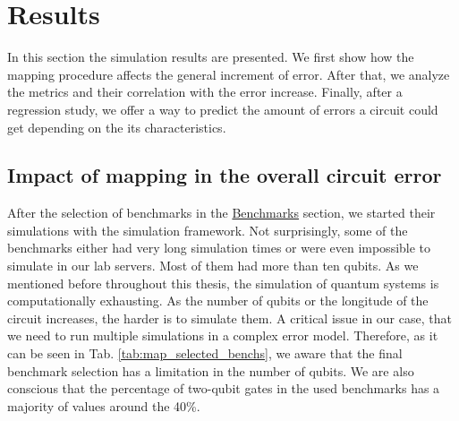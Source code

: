 
\chapter{Results}
\label{sec:org25630c4}

In this section the simulation results are presented.
We first show how the mapping procedure affects the general increment of error.
After that, we analyze the metrics and their correlation with the error increase.
Finally, after a regression study, we offer a way to predict the amount of errors a circuit could get depending on the its characteristics.

\section{Impact of mapping in the overall circuit error}
\label{sec:orga72fe94}

After the selection of benchmarks in the \href{chapter-4.org}{Benchmarks} section, we started their simulations with the simulation framework.
Not surprisingly, some of the benchmarks either had very long simulation times or were even impossible to simulate in our lab servers.
Most of them had more than ten qubits.
As we mentioned before throughout this thesis, the simulation of quantum systems is computationally exhausting.
As the number of qubits or the longitude of the circuit increases, the harder is to simulate them.
A critical issue in our case, that we need to run multiple simulations in a complex error model.
Therefore, as it can be seen in Tab. \ref{tab:map_selected_benchs}, we aware that the final benchmark selection has a limitation in the number of qubits.
We are also conscious that the percentage of two-qubit gates in the used benchmarks has a majority of values around the 40\%.

